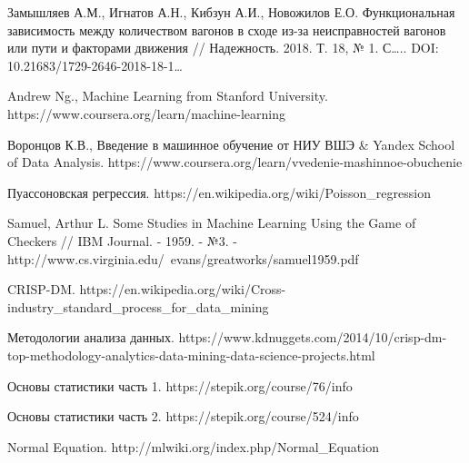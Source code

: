 \begin{thebibliography}{00}
    
     Замышляев А.М., Игнатов А.Н., Кибзун А.И., Новожилов Е.О. Функциональная зависимость между количеством вагонов в сходе из-за неисправностей вагонов или пути и факторами движения // Надежность. 2018. Т. 18, № 1. С….. DOI: 10.21683/1729-2646-2018-18-1…
    
     Andrew Ng., Machine Learning from Stanford University. https://www.coursera.org/learn/machine-learning
    
     Воронцов К.В., Введение в машинное обучение от НИУ ВШЭ \& Yandex School of Data Analysis. https://www.coursera.org/learn/vvedenie-mashinnoe-obuchenie
    
     Пуассоновская регрессия. https://en.wikipedia.org/wiki/Poisson\_regression
    
     Samuel, Arthur L. Some Studies in Machine Learning Using the Game of Checkers // IBM Journal. - 1959. - №3. - http://www.cs.virginia.edu/~evans/greatworks/samuel1959.pdf
    
     CRISP-DM. https://en.wikipedia.org/wiki/Cross-industry\_standard\_process\_for\_data\_mining
    
     Методологии анализа данных. https://www.kdnuggets.com/2014/10/crisp-dm-top-methodology-analytics-data-mining-data-science-projects.html
    
     Основы статистики часть 1. https://stepik.org/course/76/info
    
     Основы статистики часть 2. https://stepik.org/course/524/info
    
     Normal Equation. http://mlwiki.org/index.php/Normal\_Equation
    
\end{thebibliography}

